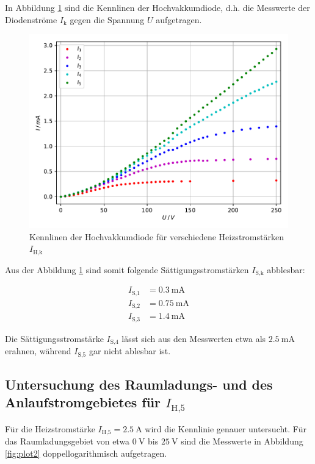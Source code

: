 In Abbildung \ref{fig:plot1} sind die Kennlinen der Hochvakkumdiode, d.h. die Messwerte der Diodenströme 
$I_\text{k}$ gegen die Spannung $U$ aufgetragen. 

\begin{figure} [H]
  \centering
  \includegraphics{content/plot1.pdf}
  \caption{Kennlinen der Hochvakkumdiode für verschiedene Heizstromstärken $I_\text{H,k}$}
  \label{fig:plot1}
\end{figure}

Aus der Abbildung \ref{fig:plot1} sind somit folgende Sättigungsstromstärken $I_\text{S,k}$ abblesbar:

\begin{align*}
  I_\text{S,1} &= \SI{0.3 }{\milli\ampere} \\
  I_\text{S,2} &= \SI{0.75}{\milli\ampere} \\
  I_\text{S,3} &= \SI{1.4}{\milli\ampere}
\end{align*}

Die Sättigungsstromstärke $I_\text{S,4}$ lässt sich aus den Messwerten etwa als $\SI{2.5}{\milli\ampere}$
erahnen, während $I_\text{S,5}$ gar nicht ablesbar ist.

\subsection{Untersuchung des Raumladungs- und des Anlaufstromgebietes für $I_\text{H,5}$}

Für die Heizstromstärke $I_\text{H,5} = \SI{2.5}{\ampere}$ wird die Kennlinie genauer untersucht.
Für das Raumladungsgebiet von etwa $\SI{0}{\volt}$ bis $\SI{25}{\volt}$ sind die Messwerte
in Abbildung \ref{fig:plot2} doppellogarithmisch aufgetragen.

